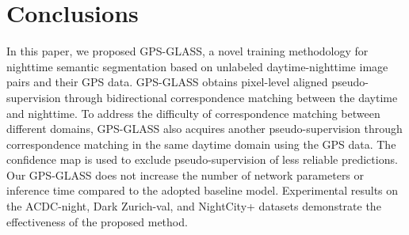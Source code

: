 \documentclass[10pt,twocolumn,letterpaper]{article}
\begin{document}
\section{Conclusions}
In this paper, we proposed GPS-GLASS, a novel training methodology for nighttime semantic segmentation based on unlabeled daytime-nighttime image pairs and their GPS data. GPS-GLASS obtains pixel-level aligned pseudo-supervision through bidirectional correspondence matching between the daytime and nighttime. To address the difficulty of correspondence matching between different domains, GPS-GLASS also acquires another pseudo-supervision through correspondence matching in the same daytime domain using the GPS data. The confidence map is used to exclude pseudo-supervision of less reliable predictions. Our GPS-GLASS does not increase the number of network parameters or inference time compared to the adopted baseline model. Experimental results on the ACDC-night, Dark Zurich-val, and NightCity+ datasets demonstrate the effectiveness of the proposed method.

\newpage

{\small


}
\end{document}
